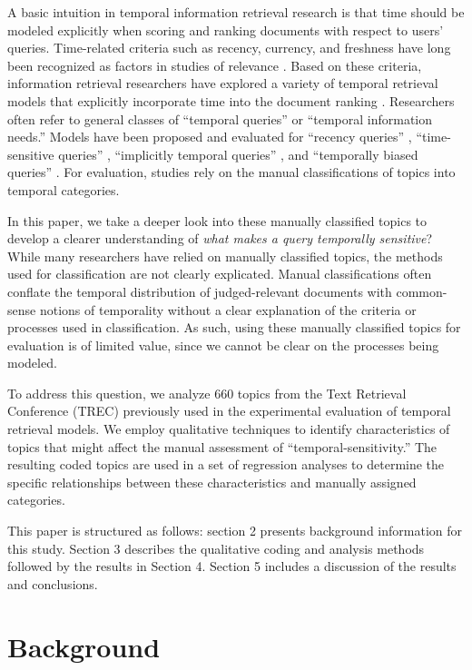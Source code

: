 \documentclass[runningheads,a4paper]{llncs}
\begin{document}
A basic intuition in temporal information retrieval research is that time should be modeled explicitly when scoring and ranking documents with respect to users' queries. Time-related criteria such as recency, currency, and freshness have long been recognized as factors in studies of relevance \cite{Barry1998}. Based on these criteria, information retrieval researchers have explored a variety of temporal retrieval models that explicitly incorporate time into the document ranking \cite{Li2003,Efron2011,Dakka2012}. Researchers often refer to general classes of ``temporal queries'' or ``temporal information needs.''  Models have been proposed and evaluated for ``recency queries'' \cite{Li2003,Efron2011}, ``time-sensitive queries'' \cite{Dakka2012}, ``implicitly temporal queries'' \cite{Metzler2009}, and ``temporally biased queries'' \cite{Jones2007}.  For evaluation,  studies rely on the manual classifications of topics into temporal categories.

In this paper, we take a deeper look into these manually classified topics to develop a clearer understanding of \emph{what makes a query temporally sensitive}? While many researchers have relied on manually classified topics, the methods used for classification are not clearly explicated. Manual classifications often conflate the temporal distribution of judged-relevant documents with common-sense notions of temporality without a clear explanation of the criteria or processes used in classification. As such, using these manually classified topics for evaluation is of limited value, since we cannot be clear on the processes being modeled. 

To address this question, we analyze  660 topics from the Text Retrieval Conference (TREC) previously used in the experimental evaluation of temporal retrieval models. We employ qualitative techniques to identify characteristics of topics that might affect the manual assessment of ``temporal-sensitivity.'' The resulting coded topics are used in a set of regression analyses to determine the specific relationships between these characteristics and manually assigned categories. 

This paper is structured as follows: section 2 presents background information for this study. Section 3 describes the qualitative coding and analysis methods followed by the results in Section 4. Section 5 includes a discussion of the results and conclusions.

\section{Background}
\end{document}
